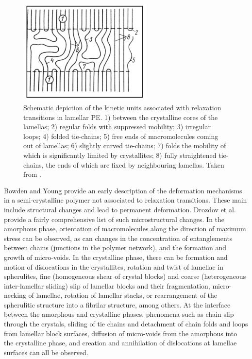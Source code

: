 \begin{figure}[hbtp]
	\centering
	\includegraphics[width=0.6\textwidth]{figures/kinetic_units_scp}
	\caption{Schematic depiction of the kinetic units associated with relaxation transitions in lamellar PE. 1) between the crystalline cores of the lamellas; 2) regular folds with suppressed mobility; 3) irregular loops; 4) folded tie-chains; 5) free ends of macromolecules coming out of lamellas; 6) slightly curved tie-chains; 7) folds the mobility of which is significantly limited by crystallites; 8) fully straightened tie-chains, the ends of which are fixed by neighbouring lamellas. Taken from \cite{arzhakovRelaxationPhysicalMechanical2019}.}
\label{fig:kinetic_units_relax_scp}
\end{figure}


Bowden and Young \citep{bowdenDeformationMechanismsCrystalline1974} provide an early description of the deformation mechanisms in a semi-crystalline polymer not associated to relaxation transitions.
These main include structural changes and lead to permanent deformation.
Drozdov et al. \citep{drozdovViscoelasticityViscoplasticityCreep2009} provide a fairly comprehensive list of such microstructural changes.
In the amorphous phase, orientation of macromolecules along the direction of maximum stress can be observed, as can changes in the concentration of entanglements between chains (junctions in the polymer network), and the formation and growth of micro-voids.
In the crystalline phase, there can be formation and motion of dislocations in the crystallites, rotation and twist of lamellae in spherulites, fine (homogeneous shear of crystal blocks) and coarse (heterogeneous inter-lamellar sliding) slip of lamellar blocks and their fragmentation, micro-necking of lamellae, rotation of lamellar stacks, or rearrangement of the spherulitic structure into a fibrilar structure, among others.
At the interface between the amorphous and crystalline phases, phenomena such as chain slip through the crystals, sliding of tie chains and detachment of chain folds and loops from lamellar block surfaces, diffusion of micro-voids from the amorphous into the crystalline phase, and creation and annihilation of dislocations at lamellae surfaces can all be observed.

